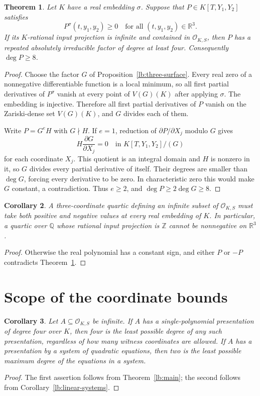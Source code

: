 \documentclass[11pt,a4paper]{article}
\newtheorem{theorem}{Theorem}[section]
\newtheorem{corollary}[theorem]{Corollary}
\theoremstyle{definition}
\newcommand{\OKS}{\mathcal O_{K,S}}
\begin{document}
\begin{theorem}\label{lb:nonnegative-eight}
Let $K$ have a real embedding $\sigma$. Suppose that
$P\in K[T,Y_1,Y_2]$ satisfies
\[
             P^\sigma(t,y_1,y_2)\ge0
                  \quad\text{for all }(t,y_1,y_2)\in\mathbb R^3.
\]
If its $K$-rational input projection is infinite and contained
in $\OKS$, then $P$ has a repeated absolutely irreducible factor
of degree at least four. Consequently $\deg P\ge8$.
\end{theorem}
\begin{proof}
Choose the factor $G$ of Proposition~\ref{lb:three-surface}.
Every real zero of a nonnegative differentiable function is a
local minimum, so all first partial derivatives of $P^\sigma$
vanish at every point of $V(G)(K)$ after applying $\sigma$.
The embedding is injective. Therefore all first partial
derivatives of $P$ vanish on the Zariski-dense set $V(G)(K)$,
and $G$ divides each of them.

Write $P=G^eH$ with $G\nmid H$. If $e=1$, reduction of
$\partial P/\partial X_j$ modulo $G$ gives
\[
               H\frac{\partial G}{\partial X_j}=0
                    \quad\text{in }K[T,Y_1,Y_2]/(G)
\]
for each coordinate $X_j$. This quotient is an integral domain
and $H$ is nonzero in it, so $G$ divides every partial derivative
of itself. Their degrees are smaller than $\deg G$, forcing
every derivative to be zero. In characteristic zero this would
make $G$ constant, a contradiction. Thus $e\ge2$, and
$\deg P\ge2\deg G\ge8$.
\end{proof}

\begin{corollary}\label{lb:quartic-sign}
A three-coordinate quartic defining an infinite subset of
$\OKS$ must take both positive and negative values at every
real embedding of $K$. In particular, a quartic over $\mathbb Q$
whose rational input projection is $\mathbb Z$ cannot be
nonnegative on $\mathbb R^3$.
\end{corollary}
\begin{proof}
Otherwise the real polynomial has a constant sign, and either
$P$ or $-P$ contradicts Theorem~\ref{lb:nonnegative-eight}.
\end{proof}

\section{Scope of the coordinate bounds}

\begin{corollary}\label{lb:degree-sharpness}
Let $A\subseteq\OKS$ be infinite. If $A$ has a single-polynomial
presentation of degree four over $K$, then four is the least
possible degree of any such presentation, regardless of how many
witness coordinates are allowed. If $A$ has a presentation by a
system of quadratic equations, then two is the least possible
maximum degree of the equations in a system.
\end{corollary}
\begin{proof}
The first assertion follows from Theorem~\ref{lb:main}; the second
follows from Corollary~\ref{lb:linear-systems}.
\end{proof}
\end{document}
